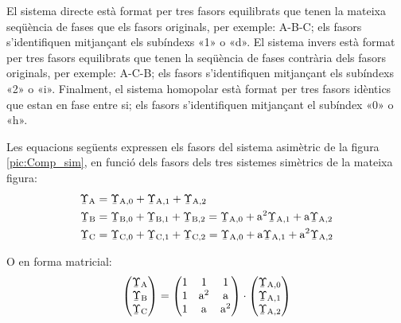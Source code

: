 \begin{center}
    
    \label{pic:Comp_sim}
\end{center}

 
 El sistema directe està format per tres
fasors equilibrats que tenen la mateixa seqüència de fases que els fasors
originals, per exemple: A-B-C; els fasors
s'identifiquen mitjançant els subíndexs «1» o «d». El sistema
invers està format per tres fasors equilibrats que tenen la seqüència de fases contrària
 dels fasors originals, per exemple: A-C-B; els fasors s'identifiquen mitjançant els
subíndexs «2» o «i». Finalment, el sistema homopolar està
format per tres fasors idèntics que estan en fase entre si; els fasors 
s'identifiquen mitjançant el subíndex «0» o «h».

Les equacions següents expressen els fasors del sistema asimètric de la figura \vref{pic:Comp_sim}, en funció
dels fasors dels tres sistemes simètrics de la mateixa figura:
\begin{subequations}
\begin{align}
   \cmplx{\Upsilon}\ped{A} &= \cmplx{\Upsilon}\ped{A,0}  +
   \cmplx{\Upsilon}\ped{A,1} + \cmplx{\Upsilon}\ped{A,2} \label{eq:c_sim_a}\\
   \cmplx{\Upsilon}\ped{B} &= \cmplx{\Upsilon}\ped{B,0} + \cmplx{\Upsilon}\ped{B,1} +
   \cmplx{\Upsilon}\ped{B,2}  =  \cmplx{\Upsilon}\ped{A,0} + \au^2
   \cmplx{\Upsilon}\ped{A,1} + \au \cmplx{\Upsilon}\ped{A,2} \label{eq:c_sim_b}\\
   \cmplx{\Upsilon}\ped{C} &= \cmplx{\Upsilon}\ped{C,0} + \cmplx{\Upsilon}\ped{C,1} +
   \cmplx{\Upsilon}\ped{C,2}  = \cmplx{\Upsilon}\ped{A,0} + \au
   \cmplx{\Upsilon}\ped{A,1} + \au^2 \cmplx{\Upsilon}\ped{A,2} \label{eq:c_sim_c}
\end{align}
\end{subequations}

O en forma matricial:
\begin{equation}\label{eq:c_sim_mat}
   \begin{pmatrix}
     \cmplx{\Upsilon}\ped{A} \\
     \cmplx{\Upsilon}\ped{B} \\
     \cmplx{\Upsilon}\ped{C}
   \end{pmatrix} =
   \begin{pmatrix}
     1 & 1 & 1 \\
     1 & \au^2 & \au\\
     1 & \au & \au^2
   \end{pmatrix} \cdot
   \begin{pmatrix}
     \cmplx{\Upsilon}\ped{A,0} \\
     \cmplx{\Upsilon}\ped{A,1} \\
     \cmplx{\Upsilon}\ped{A,2}
   \end{pmatrix}
\end{equation}

